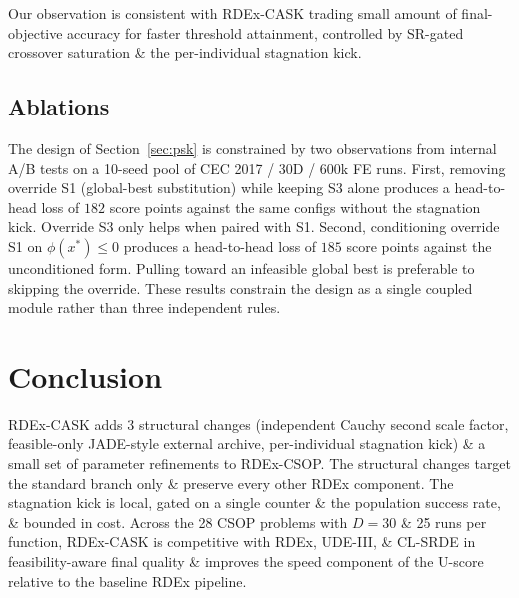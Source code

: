 \documentclass[conference]{IEEEtran}
\begin{document}
Our observation is consistent with RDEx-CASK trading small amount of final-objective accuracy for faster threshold attainment, controlled by SR-gated crossover saturation \& the per-individual stagnation kick.

\subsection{Ablations}
The design of Section~\ref{sec:psk} is constrained by two observations from internal A/B tests on a 10-seed pool of CEC 2017 / 30D / 600k FE runs. First, removing override S1 (global-best substitution) while keeping S3 alone produces a head-to-head loss of $182$ score points against the same configs without the stagnation kick. Override S3 only helps when paired with S1. Second, conditioning override S1 on $\phi(x^{*}) \le 0$ produces a head-to-head loss of $185$ score points against the unconditioned form. Pulling toward an infeasible global best is preferable to skipping the override. These results constrain the design as a single coupled module rather than three independent rules.

\section{Conclusion}
RDEx-CASK adds 3 structural changes (independent Cauchy second scale factor, feasible-only JADE-style external archive, per-individual stagnation kick) \& a small set of parameter refinements to RDEx-CSOP. The structural changes target the standard branch only \& preserve every other RDEx component. The stagnation kick is local, gated on a single counter \& the population success rate, \& bounded in cost. Across the 28 CSOP problems with $D = 30$ \& 25 runs per function, RDEx-CASK is competitive with RDEx, UDE-III, \& CL-SRDE in feasibility-aware final quality \& improves the speed component of the U-score relative to the baseline RDEx pipeline.



\end{document}
